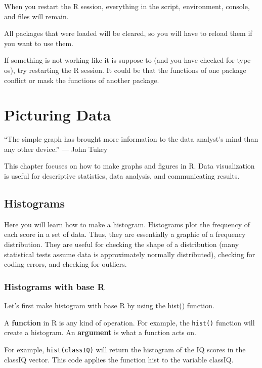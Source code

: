 \documentclass[
]{book}
\begin{document}
When you restart the R session, everything in the script, environment, console, and files will remain.

All packages that were loaded will be cleared, so you will have to reload them if you want to use them.

If something is not working like it is suppose to (and you have checked for type-os), try restarting the R session. It could be that the functions of one package conflict or mask the functions of another package.

\hypertarget{picturing-data}{%
\chapter{Picturing Data}\label{picturing-data}}

``The simple graph has brought more information to the data analyst's mind than any other device.'' --- John Tukey

This chapter focuses on how to make graphs and figures in R. Data visualization is useful for descriptive statistics, data analysis, and communicating results.

\hypertarget{histograms}{%
\section{Histograms}\label{histograms}}

Here you will learn how to make a histogram. Histograms plot the frequency of each score in a set of data. Thus, they are essentially a graphic of a frequency distribution. They are useful for checking the shape of a distribution (many statistical tests assume data is approximately normally distributed), checking for coding errors, and checking for outliers.

\hypertarget{histograms-with-base-r}{%
\subsection{Histograms with base R}\label{histograms-with-base-r}}

Let's first make histogram with base R by using the hist() function.

A \textbf{function} in R is any kind of operation. For example, the \texttt{hist()} function will create a histogram. An \textbf{argument} is what a function acts on.

For example, \texttt{hist(classIQ)} will return the histogram of the IQ scores in the classIQ vector. This code applies the function hist to the variable classIQ.
\end{document}
